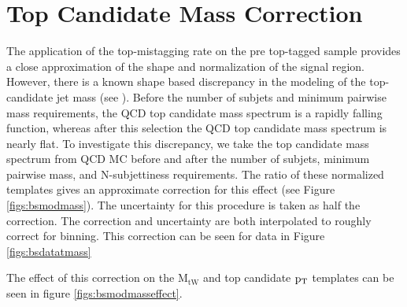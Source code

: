 \section{Top Candidate Mass Correction}
\label{sec:bsmodmass}
The application of the top-mistagging rate on the pre top-tagged sample provides a close approximation of the shape and normalization of the signal region.  
However, there is a known shape based discrepancy in the modeling of the top-candidate jet mass (see \cite{7tevZprime}). 
Before the number of subjets and minimum pairwise mass requirements, the QCD top candidate mass spectrum is a rapidly falling function, whereas after 
this selection the QCD top candidate mass spectrum is nearly flat.  To investigate this discrepancy, we take the top candidate mass 
spectrum from QCD MC before and after the number of subjets, minimum pairwise mass, and N-subjettiness requirements.  
The ratio of these normalized templates gives an approximate correction for this effect (see Figure \ref{figs:bsmodmass}).  The uncertainty for this procedure is taken as half the correction.  
The correction and uncertainty are both interpolated to roughly correct for binning.  This correction can be seen for data in Figure \ref{figs:bsdatatmass}

The effect of this correction on the $\mathrm{M_{tW}}$ and top candidate $\mathrm{p_{T}}$ templates can be seen in figure \ref{figs:bsmodmasseffect}.

